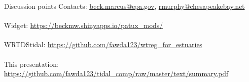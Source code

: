 \documentclass[serif]{beamer}\usepackage[]{graphicx}\usepackage[]{color}
\begin{document}
\begin{frame}{Discussion points}
Contacts: \href{mailto:beck.marcus@epa.gov}{beck.marcus@epa.gov}, \href{mailto:rmurphy@chesapeakebay.net}{rmurphy@chesapeakebay.net} \\~\\
Widget: \href{https://beckmw.shinyapps.io/patux_mods/}{https://beckmw.shinyapps.io/patux\_mods/} \\~\\
WRTDStidal: \href{https://github.com/fawda123/wtreg_for_estuaries}{https://github.com/fawda123/wtreg\_for\_estuaries} \\~\\
This presentation: \href{https://github.com/fawda123/tidal_comp/raw/master/text/summary.pdf}{https://github.com/fawda123/tidal\_comp/raw/master/text/summary.pdf}
\end{frame}
\end{document}
